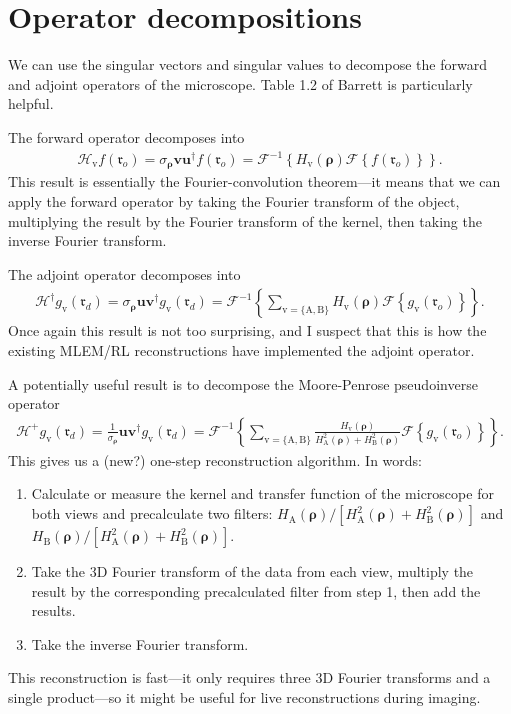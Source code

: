 \documentclass[11pt]{article}
\providecommand{\mb}[1]{\mathbf{#1}}
\providecommand{\mc}[1]{\mathcal{#1}}
\providecommand{\ro}[1]{\mathbf{\mathfrak{r}}_o}
\providecommand{\rd}[1]{\mathbf{\mathfrak{r}}_d}
\providecommand{\bs}[1]{\boldsymbol{#1}}
\begin{document}
\section{Operator decompositions}
We can use the singular vectors and singular values to decompose the forward and
adjoint operators of the microscope. Table 1.2 of Barrett is particularly
helpful.

The forward operator decomposes into
\begin{align}
  \mc{H}_{\text{v}}f(\ro{}) = \sigma_{\bs{\rho}}\mb{v}\mb{u}^{\dagger}f(\ro{}) = \mc{F}^{-1}\left\{H_{\text{v}}(\bs{\rho})\mc{F}\left\{f(\ro{})\right\}\right\}. 
\end{align}
This result is essentially the Fourier-convolution theorem---it means that we
can apply the forward operator by taking the Fourier transform of the object,
multiplying the result by the Fourier transform of the kernel, then taking the
inverse Fourier transform.

The adjoint operator decomposes into 
\begin{align}
  \mc{H}^{\dagger}g_\text{v}(\rd{}) = \sigma_{\bs{\rho}}\mb{u}\mb{v}^{\dagger}g_\text{v}(\rd{}) = \mc{F}^{-1}\left\{\sum_{\text{v} = \{\text{A}, \text{B}\}}H_{\text{v}}(\bs{\rho})\mc{F}\left\{g_{\text{v}}(\ro{})\right\}\right\}. 
\end{align}
Once again this result is not too surprising, and I suspect that this is how the
existing MLEM/RL reconstructions have implemented the adjoint operator.

A potentially useful result is to decompose the Moore-Penrose pseudoinverse
operator
\begin{align}
  \mc{H}^+g_{\text{v}}(\rd{}) = \frac{1}{\sigma_{\bs{\rho}}}\mb{u}\mb{v}^{\dagger}g_{\text{v}}(\rd{}) = \mc{F}^{-1}\left\{\sum_{\text{v} = \{\text{A}, \text{B}\}}\frac{H_{\text{v}}(\bs{\rho})}{H_{\text{A}}^2(\bs{\rho}) + H_{\text{B}}^2(\bs{\rho})}\mc{F}\left\{g_{\text{v}}(\ro{})\right\}\right\}. \label{eq:mp}
\end{align}
This gives us a (new?) one-step reconstruction algorithm. In words:
\begin{enumerate}
\item Calculate or measure the kernel and transfer function of the microscope
  for both views and precalculate two filters:
  $H_{\text{A}}(\bs{\rho})/[H^2_{\text{A}}(\bs{\rho}) + H^2_{\text{B}}(\bs{\rho})]$ and $H_{\text{B}}(\bs{\rho})/[H^2_{\text{A}}(\bs{\rho}) + H^2_{\text{B}}(\bs{\rho})]$.
\item Take the 3D Fourier transform of the data from each view, multiply the
  result by the corresponding precalculated filter from step 1, then add the
  results.
\item Take the inverse Fourier transform. 
\end{enumerate}
This reconstruction is fast---it only requires three 3D Fourier transforms and a
single product---so it might be useful for live reconstructions during imaging.
\end{document}
